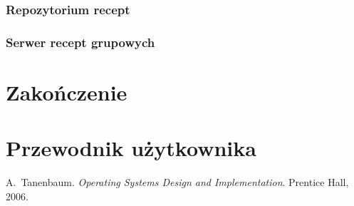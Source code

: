 \documentclass[11pt,a4paper,polish,thesis]{dcsbook}
\begin{document}
\subsection{Repozytorium recept}
\subsection{Serwer recept grupowych}

\chapter{Zakończenie}

\appendix

\chapter{Przewodnik użytkownika}

\backmatter

\begin{thebibliography}{1}
A.~Tanenbaum. \emph{Operating Systems Design and Implementation}. Prentice Hall, 2006.
\end{thebibliography}
\end{document}
